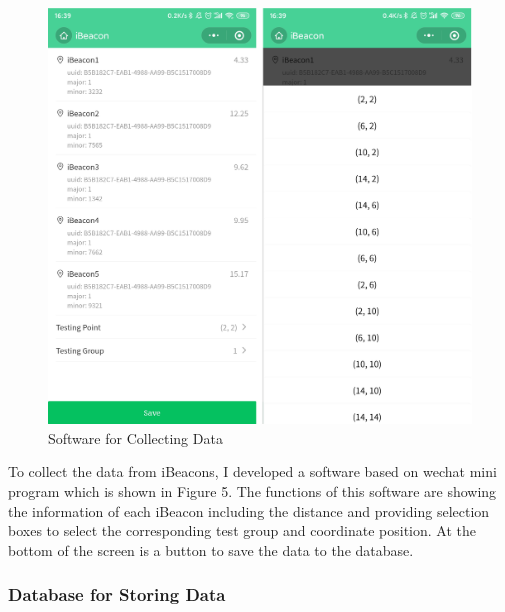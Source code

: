 \documentclass{sigchi}
\begin{document}
\begin{figure}[!h]
\centering
\includegraphics[width=1\columnwidth]{6.png}
\caption{Software for Collecting Data}
\label{fig:universe}
\end{figure}

To collect the data from iBeacons, I developed a software based on wechat mini program which is shown in Figure 5. The functions of this software are showing the information of each iBeacon including the distance and providing selection boxes to select the corresponding test group and coordinate position. At the bottom of the screen is a button to save the data to the database.

\subsubsection{Database for Storing Data}
\end{document}
